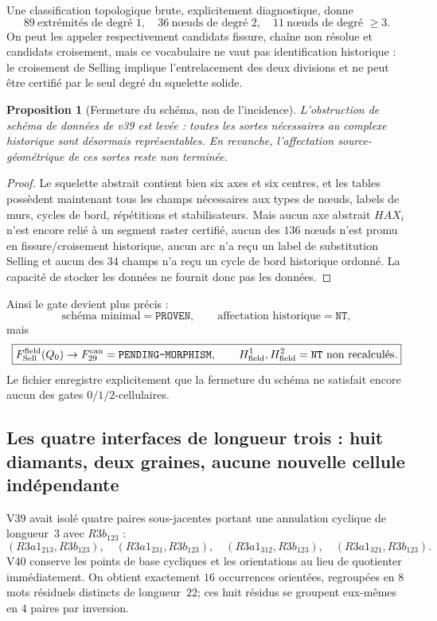 \documentclass[11pt,a4paper]{article}
\newtheorem{proposition}[theorem]{Proposition}
\newcommand{\certProven}{\texttt{PROVEN}}
\newcommand{\certPending}{\texttt{PENDING-MORPHISM}}
\newcommand{\certNT}{\texttt{NT}}
\begin{document}
Une classification topologique brute, explicitement diagnostique, donne
\[
 \boxed{89\ \text{extrémités de degré }1,
 \quad 36\ \text{nœuds de degré }2,
 \quad 11\ \text{nœuds de degré }\ge3.}
\]
On peut les appeler respectivement candidats fissure, chaîne non résolue et candidats croisement, mais ce vocabulaire ne vaut pas identification historique : le croisement de Selling implique l'entrelacement des deux divisions et ne peut être certifié par le seul degré du squelette solide.

\begin{proposition}[Fermeture du schéma, non de l'incidence]
L'obstruction de \emph{schéma de données} de v39 est levée : toutes les sortes nécessaires au complexe historique sont désormais représentables. En revanche, l'affectation source-géométrique de ces sortes reste non terminée.
\end{proposition}
\begin{proof}
Le squelette abstrait contient bien six axes et six centres, et les tables possèdent maintenant tous les champs nécessaires aux types de nœuds, labels de murs, cycles de bord, répétitions et stabilisateurs. Mais aucun axe abstrait $HAX_i$ n'est encore relié à un segment raster certifié, aucun des $136$ nœuds n'est promu en fissure/croisement historique, aucun arc n'a reçu un label de substitution Selling et aucun des $34$ champs n'a reçu un cycle de bord historique ordonné. La capacité de stocker les données ne fournit donc pas les données.
\end{proof}

Ainsi le gate devient plus précis :
\[
 \boxed{
 \text{schéma minimal}=\certProven,
 \qquad
 \text{affectation historique}=\certNT,
 }
\]
mais
\[
 \boxed{
 F_{\rm Sell}^{\rm field}(Q_0)\to F_{29}^{\rm can}=\certPending,
 \qquad
 H^1_{\rm field},H^2_{\rm field}=\certNT\ \text{non recalculés}.}
\]
Le fichier  enregistre explicitement que la fermeture du schéma ne satisfait encore aucun des gates $0/1/2$-cellulaires.

\subsection{Les quatre interfaces de longueur trois : huit diamants, deux graines, aucune nouvelle cellule indépendante}

V39 avait isolé quatre paires sous-jacentes portant une annulation cyclique de longueur~$3$ avec $R3b_{123}$ :
\[
 (R3a1_{213},R3b_{123}),\quad
 (R3a1_{231},R3b_{123}),\quad
 (R3a1_{312},R3b_{123}),\quad
 (R3a1_{321},R3b_{123}).
\]
V40 conserve les points de base cycliques et les orientations au lieu de quotienter immédiatement. On obtient exactement $16$ occurrences orientées, regroupées en $8$ mots résiduels distincts de longueur~$22$; ces huit résidus se groupent eux-mêmes en $4$ paires par inversion.
\end{document}

